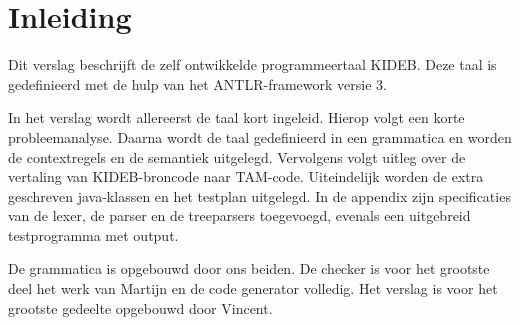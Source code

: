 \chapter{Inleiding} %
\label{cha:inleiding}
Dit verslag beschrijft de zelf ontwikkelde programmeertaal KIDEB. Deze taal is gedefinieerd met de hulp van het ANTLR-framework versie 3. 

In het verslag wordt allereerst de taal kort ingeleid. Hierop volgt een korte probleemanalyse. Daarna wordt de taal gedefinieerd in een grammatica en worden de contextregels en de semantiek uitgelegd. Vervolgens volgt uitleg over de vertaling van KIDEB-broncode naar TAM-code. Uiteindelijk worden de extra geschreven java-klassen en het testplan uitgelegd. In de appendix zijn specificaties van de lexer, de parser en de treeparsers toegevoegd, evenals een uitgebreid testprogramma met output.

De grammatica is opgebouwd door ons beiden. De checker is voor het grootste deel het werk van Martijn en de code generator volledig. Het verslag is voor het grootste gedeelte opgebouwd door Vincent.
\clearpage